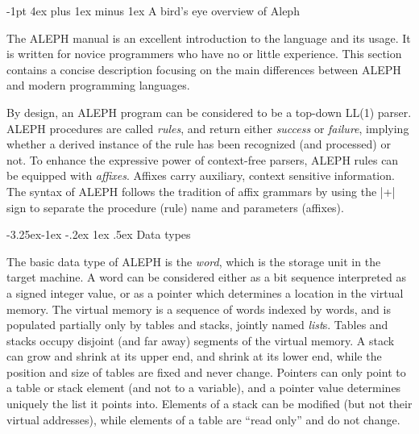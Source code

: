 \documentclass[titlepage]{article}
\makeatletter
\newcommand\A{\textsf{ALEPH}}
\newcommand\g[1]{\textsf{\color{blue!90!black}#1}}
\renewcommand\subsection{%
\@startsection{subsection}{2}{\z@}%
   {-3.25ex\@plus -1ex \@minus -.2ex}%
   {1ex \@plus .5ex}%
   {\normalfont\normalsize\bfseries}}
\renewcommand\section{%
\newpage
\@startsection{section}{1}{\z@}%
   {-1pt}%
   {4ex plus 1ex minus 1ex}%
   {\normalfont\Large\bfseries}}
\let\osection\section
\def\section {\newpage\osection}
\makeatother
\begin{document}
\tableofcontents
\newpage

\section{A bird's eye overview of Aleph}\label{section:overview}

The \A{} manual \cite{A-manual} is an excellent introduction to the language
and its usage. It is written for novice programmers who have no or little
experience. This section contains a concise description focusing on the main
differences between \A{} and modern programming languages.

By design, an \A{} program can be considered to be a top-down \g{LL(1)}
parser\cite{aho-ullman}. \A{} procedures are called \emph{rules}, and return
either \emph{success} or \emph{failure}, implying whether a derived instance
of the rule has been recognized (and processed) or not. To enhance the
expressive power of context-free parsers, \A{} rules can be equipped with
\emph{affixes}. Affixes carry auxiliary, context sensitive information. The
syntax of \A{} follows the tradition of affix grammars \cite{wijn} by using
the \pp|+| sign to separate the procedure (rule) name and parameters
(affixes).


\subsection{Data types}

The basic data type of \A{} is the \emph{word}, which is the storage unit in
the target machine. A word can be considered either as a bit sequence
interpreted as a signed integer value, or as a pointer which determines a
location in the virtual memory. The virtual memory is a sequence of words
indexed by words, and is populated partially only by \g{table}s and
\g{stack}s, jointly named \emph{list}s. Tables and stacks occupy disjoint
(and far away) segments of the virtual memory. A stack can grow and shrink
at its upper end, and shrink at its lower end, while the position and size
of tables are fixed and never change. Pointers can only point to a table or
stack element (and not to a variable), and a pointer value determines
uniquely the list it points into. Elements of a \g{stack} can be modified
(but not their virtual addresses), while elements of a \g{table} are ``read
only'' and do not change.
\end{document}
